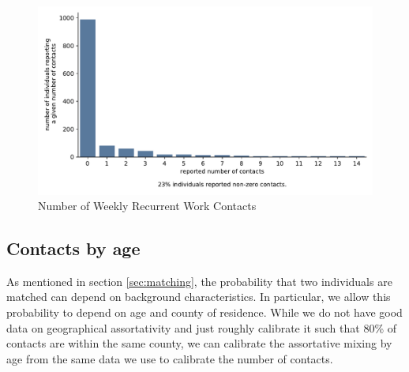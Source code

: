 \begin{figure}
    \centering
    \includegraphics[width=\textwidth]{../figures/results/figures/data/distributions_of_the_number_of_contacts/work_recurrent_weekly}
    \caption{Number of Weekly Recurrent Work Contacts}
    \label{n_contacts_work_weekly_recurrent}
\end{figure}


\FloatBarrier


\subsection{Contacts by age}
\label{subsec:contacts_by_age}

As mentioned in section \ref{sec:matching}, the probability that two individuals are
matched can depend on background characteristics. In particular, we allow this
probability to depend on age and county of residence. While we do not have good data on
geographical assortativity and just roughly calibrate it such that 80\% of contacts are
within the same county, we can calibrate the assortative mixing by age from the same
data we use to calibrate the number of contacts.

